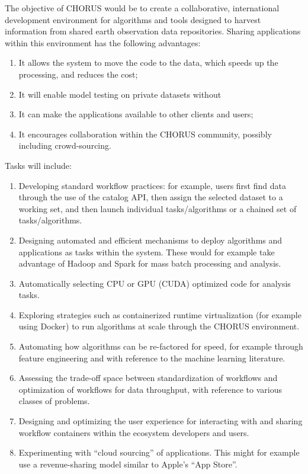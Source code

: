 
The objective of CHORUS would be to create a collaborative,
international development environment for algorithms and tools
designed to harvest information from shared earth observation data
repositories. Sharing applications within this environment has the
following advantages:
\begin{enumerate}
	\item It allows the system to move the code to the data, which
          speeds up the processing, and reduces the cost;
        \item It will enable model testing on private datasets without
	\item It can make the applications available to other clients
          and users;
	\item It encourages collaboration within the CHORUS community,
          possibly including crowd-sourcing.
\end{enumerate}

Tasks will include:
\begin{enumerate}
	\item Developing standard workflow practices: for example,
          users first find data through the use of the catalog API,
          then assign the selected dataset to a working set, and then
          launch individual tasks/algorithms or a chained set of
          tasks/algorithms.
	\item Designing automated and efficient mechanisms to deploy
          algorithms and applications as tasks within the system.
          These would for example take advantage of Hadoop and Spark
          for mass batch processing and analysis.
	\item Automatically selecting CPU or GPU (CUDA) optimized code
          for analysis tasks.
	\item Exploring strategies such as containerized runtime
          virtualization (for example using Docker) to run algorithms
          at scale through the CHORUS environment.
	\item Automating how algorithms can be re-factored for speed,
          for example through feature engineering and with reference
          to the machine learning literature.
	\item Assessing the trade-off space between standardization of
          workflows and optimization of workflows for data throughput,
          with reference to various classes of problems.
	\item Designing and optimizing the user experience for
          interacting with and sharing workflow containers within the
          ecosystem developers and users.
	\item Experimenting with ``cloud sourcing'' of applications.
          This might for example use a revenue-sharing model similar
          to Apple's ``App Store''.
\end{enumerate}


